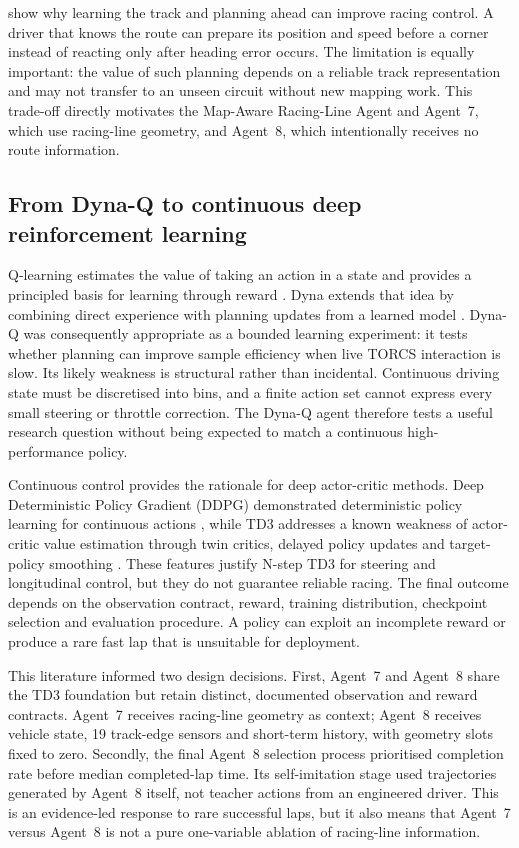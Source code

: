 \textcite{quadflieg2010} show why learning the track and planning ahead can improve racing control. A driver that knows the route can prepare its position and speed before a corner instead of reacting only after heading error occurs. The limitation is equally important: the value of such planning depends on a reliable track representation and may not transfer to an unseen circuit without new mapping work. This trade-off directly motivates the Map-Aware Racing-Line Agent and Agent~7, which use racing-line geometry, and Agent~8, which intentionally receives no route information.

\subsection{From Dyna-Q to continuous deep reinforcement learning}

Q-learning estimates the value of taking an action in a state and provides a principled basis for learning through reward \parencite{watkinsdayan1992}. Dyna extends that idea by combining direct experience with planning updates from a learned model \parencite{sutton1990}. Dyna-Q was consequently appropriate as a bounded learning experiment: it tests whether planning can improve sample efficiency when live TORCS interaction is slow. Its likely weakness is structural rather than incidental. Continuous driving state must be discretised into bins, and a finite action set cannot express every small steering or throttle correction. The Dyna-Q agent therefore tests a useful research question without being expected to match a continuous high-performance policy.

Continuous control provides the rationale for deep actor-critic methods. Deep Deterministic Policy Gradient (DDPG) demonstrated deterministic policy learning for continuous actions \parencite{lillicrap2016}, while TD3 addresses a known weakness of actor-critic value estimation through twin critics, delayed policy updates and target-policy smoothing \parencite{fujimoto2018}. These features justify N-step TD3 for steering and longitudinal control, but they do not guarantee reliable racing. The final outcome depends on the observation contract, reward, training distribution, checkpoint selection and evaluation procedure. A policy can exploit an incomplete reward or produce a rare fast lap that is unsuitable for deployment.

This literature informed two design decisions. First, Agent~7 and Agent~8 share the TD3 foundation but retain distinct, documented observation and reward contracts. Agent~7 receives racing-line geometry as context; Agent~8 receives vehicle state, 19 track-edge sensors and short-term history, with geometry slots fixed to zero. Secondly, the final Agent~8 selection process prioritised completion rate before median completed-lap time. Its self-imitation stage used trajectories generated by Agent~8 itself, not teacher actions from an engineered driver. This is an evidence-led response to rare successful laps, but it also means that Agent~7 versus Agent~8 is not a pure one-variable ablation of racing-line information.

